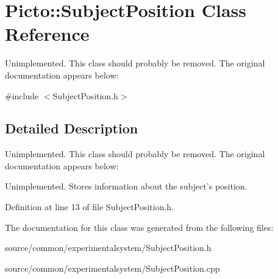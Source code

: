 \hypertarget{class_picto_1_1_subject_position}{\section{Picto\-:\-:Subject\-Position Class Reference}
\label{class_picto_1_1_subject_position}
}


Unimplemented. This class should probably be removed. The original documentation appears below\-:  




{\ttfamily \#include $<$Subject\-Position.\-h$>$}



\subsection{Detailed Description}
Unimplemented. This class should probably be removed. The original documentation appears below\-: 

Unimplemented. Stores information about the subject's position. 

Definition at line 13 of file Subject\-Position.\-h.



The documentation for this class was generated from the following files\-:\begin{DoxyCompactItemize}
\item 
source/common/experimentalsystem/Subject\-Position.\-h\item 
source/common/experimentalsystem/Subject\-Position.\-cpp\end{DoxyCompactItemize}
